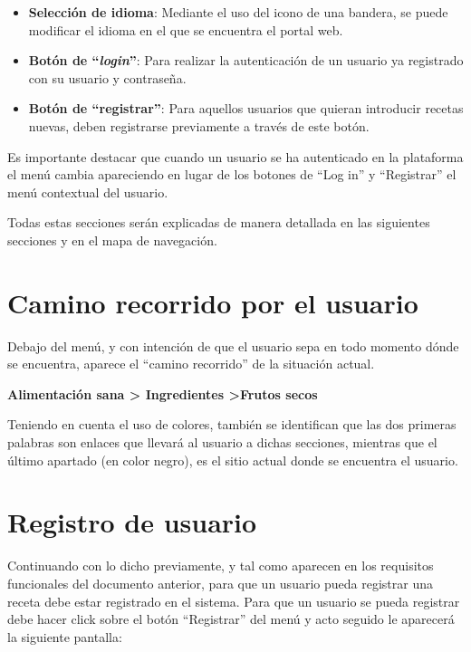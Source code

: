 \documentclass{\ClassPath/viu-tfm-template}
\begin{document}
\begin{itemize}
    \item \textbf{Selección de idioma}: Mediante el uso del icono de una bandera, se puede modificar el idioma en el que se encuentra el portal web.

    \item \textbf{Botón de “\textit{login}”}: Para realizar la autenticación de un usuario ya registrado con su usuario y contraseña.

    \item \textbf{Botón de “registrar”}: Para aquellos usuarios que quieran introducir recetas nuevas, deben registrarse previamente a través de este botón.
    \vspace{-1em}
\end{itemize}

Es importante destacar que cuando un usuario se ha autenticado en la plataforma el menú cambia apareciendo en lugar de los botones de “Log in” y “Registrar” el menú contextual del usuario.

Todas estas secciones serán explicadas de manera detallada en las siguientes secciones y en el mapa de navegación.

\section{Camino recorrido por el usuario}

Debajo del menú, y con intención de que el usuario sepa en todo momento dónde se encuentra, aparece el “camino recorrido” de la situación actual.

\begin{center}
    \vspace{-10pt}
    \textbf{\color{maincolor}Alimentación sana > \space Ingredientes \color{black} >\space Frutos secos}
    \vspace{-15pt}
\end{center}

Teniendo en cuenta el uso de colores, también se identifican que las dos primeras palabras son enlaces que llevará al usuario a dichas secciones, mientras que el último apartado (en color negro), es el sitio actual donde se encuentra el usuario.


\section{Registro de usuario}
Continuando con lo dicho previamente, y tal como aparecen en los requisitos funcionales del documento anterior, para que un usuario pueda registrar una receta debe estar registrado en el sistema. Para que un usuario se pueda registrar debe hacer click sobre el botón “Registrar” del menú y acto seguido le aparecerá la siguiente pantalla:
\end{document}
